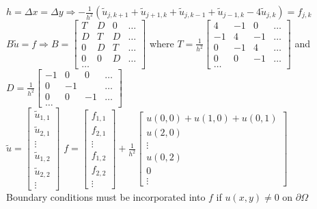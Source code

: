 $h=\Delta x = \Delta y \Rightarrow \boxed{-\frac 1 {h^2} (\tilde{u}_{j,k+1} +
\tilde{u}_{j+1,k} + \tilde{u}_{j,k-1} + \tilde{u}_{j-1,k} - 4 \tilde{u}_{j,k})
= f_{j, k}}$\\[0.4cm]


$B \tilde{u} = f \Rightarrow B= \begin{bmatrix}
             T& D & 0 & \ldots \\
             D& T & D & \ldots \\
              0& D & T & \ldots \\
              0& 0 & D & \ldots \\
             \ldots
           \end{bmatrix}$
where $T=\frac{1}{h^2}\begin{bmatrix}
             4& -1 & 0 & \ldots \\
             -1& 4 & -1 & \ldots \\
              0& -1 & 4 & \ldots \\
              0& 0 & -1 & \ldots \\
             \ldots
           \end{bmatrix}$
and $D=\frac{1}{h^2}\begin{bmatrix}
             -1& 0& 0 & \ldots \\
             0 & -1 &  & \ldots \\
              0& 0&-1 & \ldots \\
             \ldots
           \end{bmatrix}$\\
   $\tilde{u}=\begin{bmatrix}
                \tilde{u}_{1,1}\\
                \tilde{u}_{2,1}\\
                \vdots\\
                \tilde{u}_{1,2}\\
                \tilde{u}_{2,2}\\
                \vdots
              \end{bmatrix}$
    $f=\begin{bmatrix}
               f_{1,1}\\
               f_{2,1}\\
               \vdots\\
               f_{1,2}\\
               f_{2,2}\\
               \vdots
             \end{bmatrix} +
             \frac{1}{h^2}\begin{bmatrix}
                u(0,0) + u(1,0) + u(0,1)\\
                u(2,0)\\
                \vdots\\
                u(0,2)\\
                0\\
                \vdots
              \end{bmatrix}$ \\
   Boundary conditions must be incorporated into $f$ if $u(x,y) \neq 0$ on $\partial\Omega$

